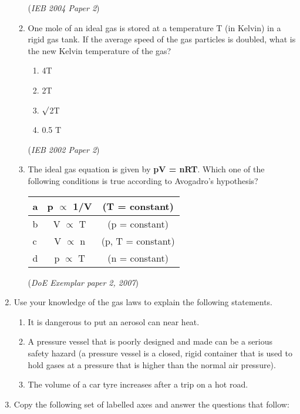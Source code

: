 \begin{eocexercises}{}
\begin{enumerate}
\begin{enumerate}
{(\textit{IEB 2004 Paper 2})
}

\item{One mole of an ideal gas is stored at a temperature T (in Kelvin) in a rigid gas tank. If the average speed of the gas particles is doubled, what is the new Kelvin temperature of the gas?

	\begin{enumerate}
	\item{4T}
	\item{2T}
	\item{$\surd$2T}
	\item{0.5 T}
	\end{enumerate}

(\textit{IEB 2002 Paper 2})
}

\item{The ideal gas equation is given by \textbf{pV = nRT}. Which one of the following conditions is true according to Avogadro's hypothesis?\\}

	\begin{tabular}{|l|c|c|}\hline
	a & p $\propto$ 1/V & (T = constant) \\\hline
	b & V $\propto$ T & (p = constant) \\\hline
	c & V $\propto$ n & (p, T = constant) \\\hline
	d & p $\propto$ T & (n = constant)\\\hline
	\end{tabular} 

(\textit{DoE Exemplar paper 2, 2007})

	\end{enumerate}

\item{Use your knowledge of the gas laws to explain the following statements.}
	\begin{enumerate}
	\item{It is dangerous to put an aerosol can near heat.}
	\item{A pressure vessel that is poorly designed and made can be a serious safety hazard (a pressure vessel is a closed, rigid container that is used to hold gases at a pressure that is higher than the normal air pressure).}
	\item{The volume of a car tyre increases after a trip on a hot road.}
	\end{enumerate}	

\item{Copy the following set of labelled axes and answer the questions that follow:

}
\end{enumerate}
\end{eocexercises}
